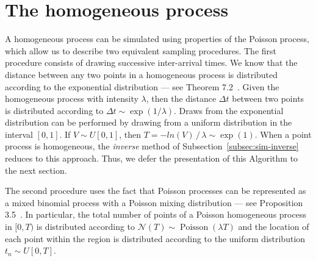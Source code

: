 \documentclass{juliacon}
\begin{document}
\section{The homogeneous process} \label{sec:method-poisson}

A homogeneous process can be simulated using properties of the Poisson process, which allow us to describe two equivalent sampling procedures. The first procedure consists of drawing successive inter-arrival times. We know that the distance between any two points in a homogeneous process is distributed according to the exponential distribution --- see Theorem 7.2~\cite{last2017}. Given the homogeneous process with intensity \( \lambda \), then the distance \( \Delta t \) between two points is distributed according to \( \Delta t \sim \exp(1/\lambda) \). Draws from the exponential distribution can be performed by drawing from a uniform distribution in the interval \( [0, 1] \). If \( V \sim U[0, 1] \), then \( T = - ln(V) \, / \, \lambda \sim \exp(1) \). When a point process is homogeneous, the \textit{inverse} method of Subsection~\ref{subsec:sim-inverse} reduces to this approach. Thus, we defer the presentation of this Algorithm to the next section.

The second procedure uses the fact that Poisson processes can be represented as a mixed binomial process with a Poisson mixing distribution --- see Proposition 3.5~\cite{last2017}. In particular, the total number of points of a Poisson homogeneous process in \( [0, T) \) is distributed according to \( \mathcal{N} (T) \sim \operatorname{Poisson}( \lambda T ) \) and the location of each point within the region is distributed according to the uniform distribution \( t_n \sim U[0, T] \). 



\end{document}
